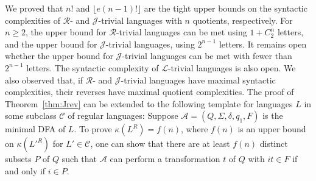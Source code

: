 \documentclass{llncs}
\renewcommand{\ge}{\geqslant}
\newcommand{\Sig}{\Sigma}
\newcommand{\cA}{{\mathcal A}}
\newcommand{\cC}{{\mathcal C}}
\newcommand{\gL}{{\mathcal L}}
\newcommand{\gR}{{\mathcal R}}
\newcommand{\gJ}{{\mathcal J}}
\begin{document}
We proved that $n!$ and $\lfloor e (n-1)! \rfloor$ are the tight upper bounds on the syntactic complexities of $\gR$- and $\gJ$-trivial languages with $n$ quotients, respectively. For $n \ge 2$, the upper bound for $\gR$-trivial languages can be met using $1 + C^n_2$ letters, and the upper bound for $\gJ$-trivial languages, using $2^{n-1}$ letters. It remains open whether the upper bound for $\gJ$-trivial languages can be met with fewer than $2^{n-1}$ letters. The syntactic complexity of $\gL$-trivial languages is also open. 
We also observed that, if $\gR$- and $\gJ$-trivial languages have maximal syntactic complexities, their reverses have maximal quotient complexities. 
The proof of Theorem~\ref{thm:Jrev} can be extended to the following template for languages $L$ in some subclass $\cC$ of regular languages: Suppose $\cA = (Q, \Sig, \delta, q_1, F)$ is the minimal DFA of $L$. To prove $\kappa(L^R) = f(n)$, where $f(n)$ is an upper bound on $\kappa(L'^R)$ for $L' \in \cC$, one can show that there are at least $f(n)$ distinct subsets $P$ of $Q$ such that $\cA$ can perform a transformation $t$ of $Q$ with $it \in F$ if and only if $i \in P$. 

\newpage
\end{document}
